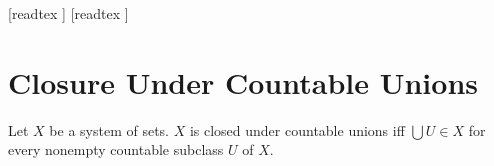 \documentclass[10pt]{article}
\begin{document}
  \begin{imports}
    \begin{forthel}
      [readtex ]
      [readtex ]
    \end{forthel}
  \end{imports}


  \section*{Closure Under Countable Unions}

  \begin{forthel}
    \begin{definition}
      Let $X$ be a system of sets.
      $X$ is closed under countable unions iff $\bigcup U \in X$ for every nonempty countable subclass $U$ of $ X$.
    \end{definition}
  \end{forthel}
\end{document}
